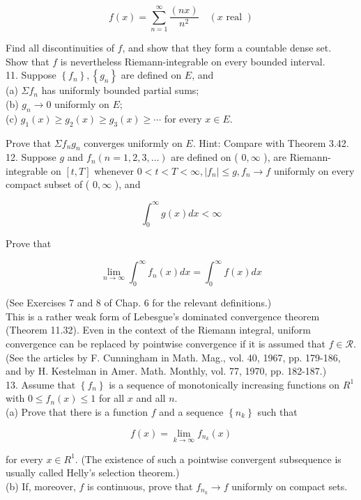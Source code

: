 \documentclass[10pt]{article}
\begin{document}
$$
f(x)=\sum_{n=1}^{\infty} \frac{(n x)}{n^{2}} \quad(x \text { real })
$$

Find all discontinuities of $f$, and show that they form a countable dense set. Show that $f$ is nevertheless Riemann-integrable on every bounded interval.\\
11. Suppose $\left\{f_{n}\right\},\left\{g_{n}\right\}$ are defined on $E$, and\\
(a) $\Sigma f_{n}$ has uniformly bounded partial sums;\\
(b) $g_{n} \rightarrow 0$ uniformly on $E$;\\
(c) $g_{1}(x) \geq g_{2}(x) \geq g_{3}(x) \geq \cdots$ for every $x \in E$.

Prove that $\Sigma f_{n} g_{n}$ converges uniformly on $E$. Hint: Compare with Theorem 3.42.\\
12. Suppose $g$ and $f_{n}(n=1,2,3, \ldots)$ are defined on ( $0, \infty$ ), are Riemann-integrable on $[t, T]$ whenever $0<t<T<\infty,\left|f_{n}\right| \leq g, f_{n} \rightarrow f$ uniformly on every compact subset of ( $0, \infty$ ), and

$$
\int_{0}^{\infty} g(x) d x<\infty
$$

Prove that

$$
\lim _{n \rightarrow \infty} \int_{0}^{\infty} f_{n}(x) d x=\int_{0}^{\infty} f(x) d x
$$

(See Exercises 7 and 8 of Chap. 6 for the relevant definitions.)\\
This is a rather weak form of Lebesgue's dominated convergence theorem (Theorem 11.32). Even in the context of the Riemann integral, uniform convergence can be replaced by pointwise convergence if it is assumed that $f \in \mathscr{R}$. (See the articles by F. Cunningham in Math. Mag., vol. 40, 1967, pp. 179-186, and by H. Kestelman in Amer. Math. Monthly, vol. 77, 1970, pp. 182-187.)\\
13. Assume that $\left\{f_{n}\right\}$ is a sequence of monotonically increasing functions on $R^{1}$ with $0 \leq f_{n}(x) \leq 1$ for all $x$ and all $n$.\\
(a) Prove that there is a function $f$ and a sequence $\left\{n_{k}\right\}$ such that

$$
f(x)=\lim _{k \rightarrow \infty} f_{n_{k}}(x)
$$

for every $x \in R^{1}$. (The existence of such a pointwise convergent subsequence is usually called Helly's selection theorem.)\\
(b) If, moreover, $f$ is continuous, prove that $f_{n_{k}} \rightarrow f$ uniformly on compact sets.
\end{document}
